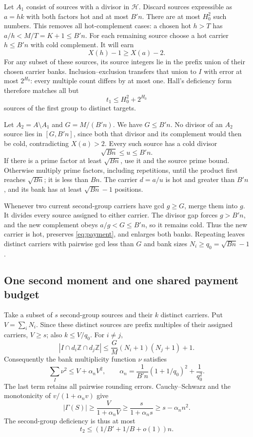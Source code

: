 \documentclass[11pt,a4paper]{article}
\begin{document}
Let $A_1$ consist of sources with a divisor in $\mathcal H$.
Discard sources expressible as $a=hk$ with both factors hot and at
most $B'n$. There are at most $H_0^2$ such numbers. This removes all
hot-complement cases: a chosen hot $h>T$ has
$a/h<M/T=K+1\le B'n$. For each remaining source choose a hot carrier
$h\le B'n$ with cold complement. It will earn
\begin{equation}
 X(h)-1\ge X(a)-2.                                    \label{eq:payment}
\end{equation}
For any subset of these sources, its source integers lie in the prefix
union of their chosen carrier banks. Inclusion--exclusion transfers that
union to $I$ with error at most $2^{H_0}$: every multiple count differs
by at most one. Hall's deficiency form therefore matches all but
\begin{equation}
 t_1\le H_0^2+2^{H_0}                                \label{eq:t1}
\end{equation}
sources of the first group to distinct targets.

Let $A_2=A\setminus A_1$ and $G=M/(B'n)$. We have $G\le B'n$.
No divisor of an $A_2$ source lies in $[G,B'n]$, since both that divisor
and its complement would then be cold, contradicting $X(a)>2$.
Every such source has a cold divisor
\[
 \sqrt{Bn}\le u\le B'n.
\]
If there is a prime factor at least $\sqrt{Bn}$, use it and the source
prime bound. Otherwise multiply prime factors, including repetitions,
until the product first reaches $\sqrt{Bn}$; it is less than $Bn$.
The carrier $d=a/u$ is hot and greater than $B'n$, and its bank has
at least $\sqrt{Bn}-1$ positions.

Whenever two current second-group carriers have gcd $g\ge G$, merge
them into $g$. It divides every source assigned to either carrier.
The divisor gap forces $g>B'n$, and the new complement obeys
$a/g<G\le B'n$, so it remains cold. Thus the new carrier is hot,
preserves \eqref{eq:payment}, and enlarges both banks. Repeating leaves
distinct carriers with pairwise gcd less than $G$ and bank sizes
$N_i\ge q_0=\sqrt{Bn}-1$.

\subsection{One second moment and one shared payment budget}
Take a subset of $s$ second-group sources and their $k$ distinct
carriers. Put $V=\sum_iN_i$. Since these distinct sources are prefix
multiples of their assigned carriers, $V\ge s$; also $k\le V/q_0$.
For $i\ne j$,
\[
 |I\cap d_i\mathbb Z\cap d_j\mathbb Z|
 \le\frac GM(N_i+1)(N_j+1)+1.
\]
Consequently the bank multiplicity function $\nu$ satisfies
\[
 \sum_I\nu^2\le V+\alpha_nV^2,
 \qquad
 \alpha_n=\frac1{B'n}(1+1/q_0)^2+\frac1{q_0^2}.
\]
The last term retains all pairwise rounding errors. Cauchy--Schwarz
and the monotonicity of $v/(1+\alpha_nv)$ give
\[
 |\Gamma(S)|\ge\frac{V}{1+\alpha_nV}
 \ge\frac{s}{1+\alpha_ns}\ge s-\alpha_nn^2.
\]
The second-group deficiency is thus at most
\begin{equation}
 t_2\le(1/B'+1/B+o(1))n.                              \label{eq:t2}
\end{equation}
\end{document}
